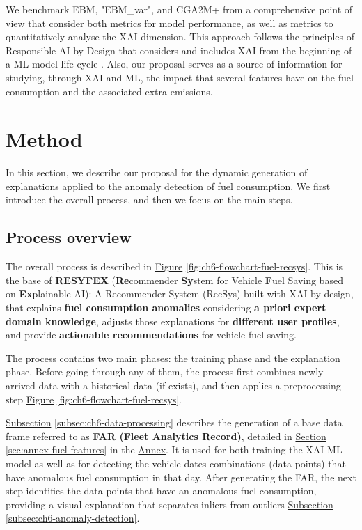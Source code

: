 We benchmark EBM, "EBM\_var", and CGA2M+ from a comprehensive point of view that consider both metrics for model performance, as well as metrics to quantitatively analyse the XAI dimension. This approach follows the principles of Responsible AI by Design that considers and includes XAI from the beginning of a ML model life cycle \parencite{benjamins2019responsible}. Also, our proposal serves as a source of information for studying, through XAI and ML, the impact that several features have on the fuel consumption and the associated extra emissions.

\section{Method}\label{sec:ch6-method}
In this section, we describe our proposal for the dynamic generation of explanations applied to the anomaly detection of fuel consumption. We first introduce the overall process, and then we focus on the main steps. 

\subsection{Process overview}\label{subsec:ch6-process-overview}
The overall process is described in \hyperref[fig:ch6-flowchart-fuel-recsys]{Figure} \ref{fig:ch6-flowchart-fuel-recsys}. This is the base of \textbf{RESYFEX} (\textbf{Re}commender \textbf{Sy}stem for Vehicle \textbf{F}uel Saving based on \textbf{Ex}plainable AI): A Recommender System (RecSys) built with XAI by design, that explains \textbf{fuel consumption anomalies} considering \textbf{a priori expert domain knowledge}, adjusts those explanations for \textbf{different user profiles}, and provide \textbf{actionable recommendations} for vehicle fuel saving.

The process contains two main phases: the training phase and the explanation phase. Before going through any of them, the process first combines newly arrived data with a historical data (if exists), and then applies a preprocessing step \hyperref[fig:ch6-flowchart-fuel-recsys]{Figure} \ref{fig:ch6-flowchart-fuel-recsys}. 

\hyperref[subsec:ch6-data-processing]{Subsection} \ref{subsec:ch6-data-processing} describes the generation of a base data frame referred to as \textbf{FAR (Fleet Analytics Record)}, detailed in \hyperref[sec:annex-fuel-features]{Section} \ref{sec:annex-fuel-features} in the \hyperref[ch:annex]{Annex}. It is used for both training the XAI ML model as well as for detecting the vehicle-dates combinations (data points) that have anomalous fuel consumption in that day. After generating the FAR, the next step identifies the data points that have an anomalous fuel consumption, providing a visual explanation that separates inliers from outliers
\hyperref[subsec:ch6-anomaly-detection]{Subsection} \ref{subsec:ch6-anomaly-detection}.

